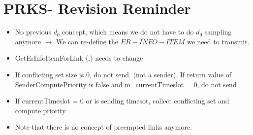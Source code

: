 \section {PRKS- Revision Reminder}
\begin{itemize}
  \item No previous $d_0$ concept, which means we do not have to do $d_0$ sampling anymore $\rightarrow$ We can re-define the $ER-INFO-ITEM$ we need to transmit.
  \item GetErInfoItemForLink (.) needs to change
  \item If conflicting set size is 0, do not send. (not a sender). If return value of SenderComputePriority is false and m\_currentTimeslot = 0, do not send
  \item If currentTimeslot = 0 or is sending timesot, collect conflicting set and compute priority
  \item Note that there is no concept of preempted links anymore.
\end{itemize}
